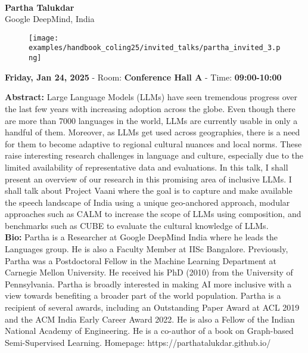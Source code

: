 {\centering
{}\\  \vspace*{-0.1cm} \leavevmode\newline
{\normalsize \textbf{Partha Talukdar}}\\
{\normalsize {Google DeepMind, India}}\\


\begin{figure}[h!]
  \centering
      \texttt{[image: examples/handbook\_coling25/invited\_talks/partha\_invited\_3.png]}
\end{figure}

 {\normalsize \textbf{Friday, Jan 24, 2025} -
 Room: \textbf{Conference Hall A} -
 Time: \textbf{09:00-10:00}\\\leavevmode\newline
 }
}

{\textbf{Abstract:}}
Large Language Models (LLMs) have seen tremendous progress over the last few years with increasing adoption across the globe. Even though there are more than 7000 languages in the world, LLMs are currently usable in only a handful of them. Moreover, as LLMs get used across geographies, there is a need for them to become adaptive to regional cultural nuances and local norms. These raise interesting research challenges in language and culture, especially due to the limited availability of representative data and evaluations. In this talk, I shall present an overview of our research in this promising area of inclusive LLMs. I shall talk about Project Vaani where the goal is to capture and make available the speech landscape of India using a unique geo-anchored approach, modular approaches such as CALM to increase the scope of LLMs using composition, and benchmarks such as CUBE to evaluate the cultural knowledge of LLMs.\\

{\textbf{Bio:}}
Partha is a Researcher at Google DeepMind India where he leads the Languages group. He is also a Faculty Member at IISc Bangalore. Previously, Partha was a Postdoctoral Fellow in the Machine Learning Department at Carnegie Mellon University. He received his PhD (2010) from the University of Pennsylvania. Partha is broadly interested in making AI more inclusive with a view towards benefiting a broader part of the world population. Partha is a recipient of several awards, including an Outstanding Paper Award at ACL 2019 and the ACM India Early Career Award 2022. He is also a Fellow of the Indian National Academy of Engineering. He is a co-author of a book on Graph-based Semi-Supervised Learning. Homepage: https://parthatalukdar.github.io/\\

\clearpage